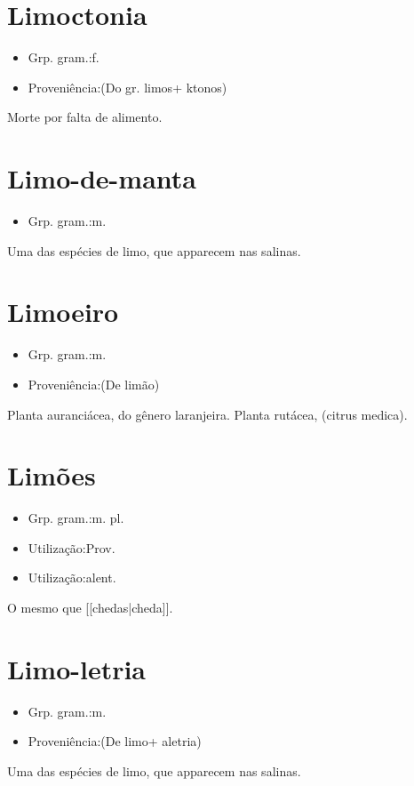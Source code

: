 \section{Limoctonia}
\begin{itemize}
\item {Grp. gram.:f.}
\end{itemize}
\begin{itemize}
\item {Proveniência:(Do gr. \textunderscore limos\textunderscore  + \textunderscore ktonos\textunderscore )}
\end{itemize}
Morte por falta de alimento.
\section{Limo-de-manta}
\begin{itemize}
\item {Grp. gram.:m.}
\end{itemize}
Uma das espécies de limo, que apparecem nas salinas.
\section{Limoeiro}
\begin{itemize}
\item {Grp. gram.:m.}
\end{itemize}
\begin{itemize}
\item {Proveniência:(De \textunderscore limão\textunderscore )}
\end{itemize}
Planta auranciácea, do gênero laranjeira.
Planta rutácea, (\textunderscore citrus medica\textunderscore ).
\section{Limões}
\begin{itemize}
\item {Grp. gram.:m. pl.}
\end{itemize}
\begin{itemize}
\item {Utilização:Prov.}
\end{itemize}
\begin{itemize}
\item {Utilização:alent.}
\end{itemize}
O mesmo que [[chedas|cheda]].
\section{Limo-letria}
\begin{itemize}
\item {Grp. gram.:m.}
\end{itemize}
\begin{itemize}
\item {Proveniência:(De \textunderscore limo\textunderscore  + \textunderscore aletria\textunderscore )}
\end{itemize}
Uma das espécies de limo, que apparecem nas salinas.
